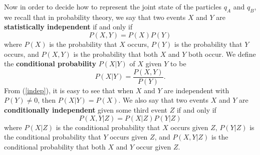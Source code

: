 \documentclass[12pt]{report}
\begin{document}
Now in order to decide how to represent the joint state of the particles $q_A$ and $q_B$, we recall that  in probability theory, we say that two events $X$ and $Y$ are \textbf{statistically independent} if and only if 
\begin{equation}\label{indep}
    P(X, Y)=P(X)P(Y)
\end{equation}
where $P(X)$ %
%
is the probability that $X$ occurs, $P(Y)$ is the probability that $Y$ occurs, and $P(X, Y)$ is the probability that both $X$ and $Y$ both occur. We define the \textbf{conditional probability} $P(X|Y)$ %
%
of $X$ given $Y$ to be
\begin{equation}\label{conditionaprob}
P(X|Y)= \frac{P(X, Y)}{P(Y)}.
\end{equation}
From (\ref{indep}), it is easy to see that when $X$ and $Y$ are independent with $P(Y)\neq 0$, then $P(X|Y)=P(X)$. We also say that two events $X$ and $Y$ are \textbf{conditionally independent} given some third event $Z$ if and only if 
\begin{equation}\label{indepcond}
P(X, Y|Z)=P(X|Z)P(Y|Z)
\end{equation} where $P(X|Z)$ is the conditional probability that $X$ occurs given $Z$, $P(Y|Z)$ is the conditional probability that $Y$ occurs given $Z$, and $P(X, Y|Z)$ is the conditional probability that both $X$ and $Y$  occur given $Z$.   
\end{document}
